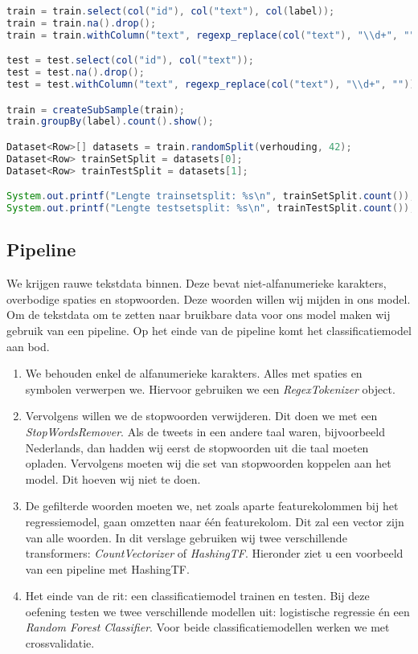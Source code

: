 \documentclass[a4paper,10pt,twoside]{report}
\begin{document}
\begin{lstlisting}[language=Java]
train = train.select(col("id"), col("text"), col(label));
train = train.na().drop();
train = train.withColumn("text", regexp_replace(col("text"), "\\d+", ""));

test = test.select(col("id"), col("text"));
test = test.na().drop();
test = test.withColumn("text", regexp_replace(col("text"), "\\d+", ""));

train = createSubSample(train);
train.groupBy(label).count().show();

Dataset<Row>[] datasets = train.randomSplit(verhouding, 42);
Dataset<Row> trainSetSplit = datasets[0];
Dataset<Row> trainTestSplit = datasets[1];

System.out.printf("Lengte trainsetsplit: %s\n", trainSetSplit.count());
System.out.printf("Lengte testsetsplit: %s\n", trainTestSplit.count());
\end{lstlisting}

\subsection*{Pipeline}

We krijgen rauwe tekstdata binnen. Deze bevat niet-alfanumerieke karakters, overbodige spaties en stopwoorden. Deze woorden willen wij mijden in ons model. Om de tekstdata om te zetten naar bruikbare data voor ons model maken wij gebruik van een pipeline. Op het einde van de pipeline komt het classificatiemodel aan bod.

\begin{enumerate}
	\item We behouden enkel de alfanumerieke karakters. Alles met spaties en symbolen verwerpen we. Hiervoor gebruiken we een \textit{RegexTokenizer} object.
	\item Vervolgens willen we de stopwoorden verwijderen. Dit doen we met een \textit{StopWordsRemover}. Als de tweets in een andere taal waren, bijvoorbeeld Nederlands, dan hadden wij eerst de stopwoorden uit die taal moeten opladen. Vervolgens moeten wij die set van stopwoorden koppelen aan het model. Dit hoeven wij niet te doen.
	\item De gefilterde woorden moeten we, net zoals aparte featurekolommen bij het regressiemodel, gaan omzetten naar één featurekolom. Dit zal een vector zijn van alle woorden. In dit verslage gebruiken wij twee verschillende transformers: \textit{CountVectorizer} of \textit{HashingTF}. Hieronder ziet u een voorbeeld van een pipeline met HashingTF.
	\item Het einde van de rit: een classificatiemodel trainen en testen. Bij deze oefening testen we twee verschillende modellen uit: logistische regressie én een \textit{Random Forest Classifier}. Voor beide classificatiemodellen werken we met crossvalidatie.
\end{enumerate}
\end{document}
